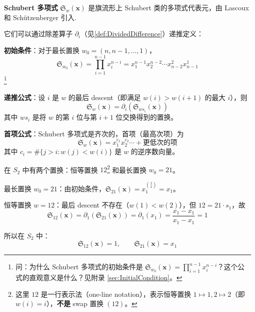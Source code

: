 \begin{Definition}
\label{def:SchubertPolynomial}
\textbf{Schubert 多项式} $\mathfrak{S}_w(\mathbf{x})$ 是旗流形上 Schubert 类的多项式代表元，由 Lascoux 和 Schützenberger 引入.

它们可以通过除差算子 $\partial_i$（见\cref{def:DividedDifference}）递推定义：

\textbf{初始条件}：对于最长置换 $w_0 = (n, n-1, \ldots, 1)$，
\begin{equation}
\mathfrak{S}_{w_0}(\mathbf{x}) = \prod_{i=1}^{n-1} x_i^{n-i} = x_1^{n-1} x_2^{n-2} \cdots x_{n-2}^2 x_{n-1}^1
\end{equation}\footnote{问：为什么 Schubert 多项式的初始条件是 $\mathfrak{S}_{w_0}(\mathbf{x}) = \prod_{i=1}^{n-1} x_i^{n-i}$？这个公式的直观意义是什么？见附录 \cref{sec:InitialCondition}。}

\textbf{递推公式}：设 $i$ 是 $w$ 的最后 descent（即满足 $w(i) > w(i+1)$ 的最大 $i$），则
\begin{equation}
\mathfrak{S}_w(\mathbf{x}) = \partial_i(\mathfrak{S}_{ws_i}(\mathbf{x}))
\end{equation}
其中 $ws_i$ 是将 $w$ 的第 $i$ 位与第 $i+1$ 位交换得到的置换。

\bigskip
\noindent\textbf{首项公式}：Schubert 多项式是齐次的，首项（最高次项）为
\begin{equation}
\mathfrak{S}_w(\mathbf{x}) = x_1^{c_1} x_2^{c_2} \cdots + \text{更低次的项}
\end{equation}
其中 $c_i = \#\{j > i : w(j) < w(i)\}$ 是 $w$ 的逆序数向量。
\end{Definition}

\begin{Example}
\label{ex:SchubertPolynomialS2}
在 $S_2$ 中有两个置换：恒等置换 $12$\footnote{这里 $12$ 是一行表示法（one-line notation），表示恒等置换 $1 \mapsto 1, 2 \mapsto 2$（即 $w(i) = i$），\textbf{不是} swap 置换 $(12)$。} 和最长置换 $w_0 = 21$。

最长置换 $w_0 = 21$：由初始条件，$\mathfrak{S}_{21}(\mathbf{x}) = x_1^{\binom{2}{2}} = x_1$。

恒等置换 $w = 12$：最后 descent 不存在（$w(1) < w(2)$），但 $12 = 21 \cdot s_1$，故
$$\mathfrak{S}_{12}(\mathbf{x}) = \partial_1(\mathfrak{S}_{21}(\mathbf{x})) = \partial_1(x_1) = \frac{x_1 - x_1}{x_1 - x_1} = 1$$

所以在 $S_2$ 中：
$$\mathfrak{S}_{12}(\mathbf{x}) = 1, \qquad \mathfrak{S}_{21}(\mathbf{x}) = x_1$$
\end{Example}

